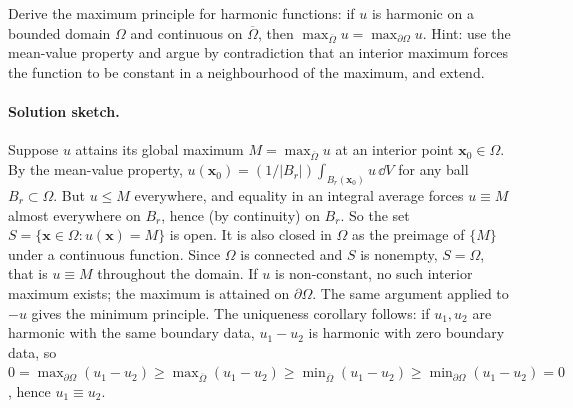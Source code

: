 \begin{exercise}
Derive the maximum principle for harmonic functions: if $u$ is
harmonic on a bounded domain $\Omega$ and continuous on
$\overline{\Omega}$, then $\max_{\overline{\Omega}} u =
\max_{\partial \Omega} u$. Hint: use the mean-value property and
argue by contradiction that an interior maximum forces the
function to be constant in a neighbourhood of the maximum, and
extend.

\paragraph{Solution sketch.}
Suppose $u$ attains its global maximum $M = \max_{\overline{\Omega}}
u$ at an interior point $\mathbf{x}_{0} \in \Omega$. By the
mean-value property, $u(\mathbf{x}_{0}) = (1/|B_{r}|) \int_{B_{r}
(\mathbf{x}_{0})} u\, \dd V$ for any ball $B_{r} \subset \Omega$.
But $u \leq M$ everywhere, and equality in an integral average
forces $u \equiv M$ almost everywhere on $B_{r}$, hence (by
continuity) on $B_{r}$. So the set $S = \{\mathbf{x} \in \Omega:
u(\mathbf{x}) = M\}$ is open. It is also closed in $\Omega$ as the
preimage of $\{M\}$ under a continuous function. Since $\Omega$ is
connected and $S$ is nonempty, $S = \Omega$, that is $u \equiv M$
throughout the domain. If $u$ is non-constant, no such interior
maximum exists; the maximum is attained on $\partial \Omega$. The
same argument applied to $-u$ gives the minimum principle. The
uniqueness corollary follows: if $u_{1}, u_{2}$ are harmonic with
the same boundary data, $u_{1} - u_{2}$ is harmonic with zero
boundary data, so $0 = \max_{\partial \Omega}(u_{1} - u_{2}) \geq
\max_{\overline{\Omega}}(u_{1} - u_{2}) \geq \min_{\overline{
\Omega}}(u_{1} - u_{2}) \geq \min_{\partial \Omega}(u_{1} - u_{2})
= 0$, hence $u_{1} \equiv u_{2}$.
\end{exercise}

